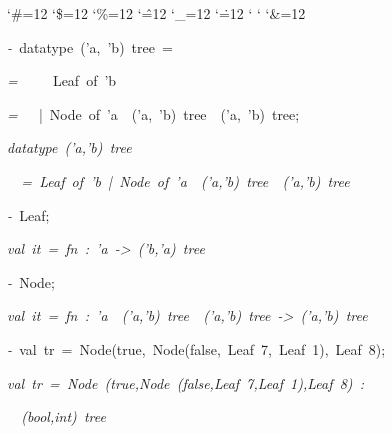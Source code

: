 \begin{list}{}
{\setlength{\leftmargin}{\leftmargini}
\setlength{\rightmargin}{0cm}
\setlength{\itemindent}{0cm}
\setlength{\listparindent}{0cm}
\setlength{\itemsep}{0cm}
\setlength{\parsep}{0cm}
\setlength{\labelsep}{0cm}
\setlength{\labelwidth}{0cm}
\catcode`\#=12
\catcode`\$=12
\catcode`\%=12
\catcode`\^=12
\catcode`\_=12
\catcode`\.=12
\catcode`
\catcode`
\catcode`\&=12
\ttfamily}
\small
\item[]\textsl{-\ }datatype\ ('a,\ 'b)\ tree\ =
\item[]\textsl{=\ }\ \ \ \ Leaf\ of\ 'b
\item[]\textsl{=\ }\ \ |\ Node\ of\ 'a\ \ ('a,\ 'b)\ tree\ \ ('a,\ 'b)\ tree;
\item[]\textsl{datatype\ ('a,'b)\ tree}
\item[]\textsl{\ \ =\ Leaf\ of\ 'b\ |\ Node\ of\ 'a\ \ ('a,'b)\ tree\ \ ('a,'b)\ tree}
\item[]\textsl{-\ }Leaf;
\item[]\textsl{val\ it\ =\ fn\ :\ 'a\ ->\ ('b,'a)\ tree}
\item[]\textsl{-\ }Node;
\item[]\textsl{val\ it\ =\ fn\ :\ 'a\ \ ('a,'b)\ tree\ \ ('a,'b)\ tree\ ->\ ('a,'b)\ tree}
\item[]\textsl{-\ }val\ tr\ =\ Node(true,\ Node(false,\ Leaf\ 7,\ Leaf\ 1),\ Leaf\ 8);
\item[]\textsl{val\ tr\ =\ Node\ (true,Node\ (false,Leaf\ 7,Leaf\ 1),Leaf\ 8)\ :}
\item[]\textsl{\ \ (bool,int)\ tree}
\end{list}
